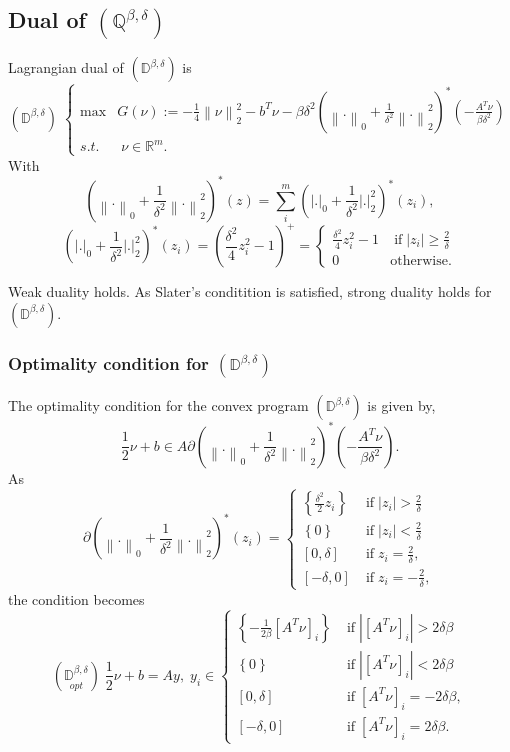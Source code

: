 \documentclass[fleqn]{report} %
\newcommand\ddfrac[2]{\frac{\displaystyle #1}{\displaystyle #2}}
\begin{document}
\subsection{Dual of $(\mathbb{Q}^{\beta,\delta})$}
Lagrangian dual of $(\mathbb{D}^{\beta,\delta})$ is 
\[
		(\mathbb{D}^{\beta,\delta})\;\left\{\begin{array}{ll}
\max & G(\nu):=-\ddfrac{1}{4}\left\|\nu\right\|^2_2 - b^T\nu - \beta\delta^2\left(\left\|.\right\|_0 + \ddfrac{1}{\delta^2}  \left\|.\right\|_2^2\right)^{*}(-\ddfrac{A^T\nu}{\beta\delta^2})\\
		s.t.&\;\nu\in\mathbb{R}^m.
		\end{array} \right.
		\]
With 
		\[
			\left(\left\|.\right\|_0 + \ddfrac{1}{\delta^2}  \left\|.\right\|_2^2\right)^{*}(z) = \sum_{i}^{m}\left(\left|.\right|_0 + \ddfrac{1}{\delta^2} \left|.\right|_2^2\right)^{*}(z_i),
		\]
\[
			\left(\left|.\right|_0 + \ddfrac{1}{\delta^2}  \left|.\right|_2^2\right)^{*}(z_i) = \left(\ddfrac{\delta^2}{4}z_i^2 - 1\right)^+=\left\{ \begin{array}{ll}
\ddfrac{\delta^2}{4}z_i^2 - 1 &\;\text{if}\; \left|z_i\right|\geq \ddfrac{2}{\delta}\\
0& \text{otherwise}.
\end{array}
\right.
		\]

Weak duality holds. As Slater's conditition is satisfied, strong duality holds for $(\mathbb{D}^{\beta,\delta})$.
\subsubsection{Optimality condition for $(\mathbb{D}^{\beta,\delta})$}
The optimality condition for the convex program $(\mathbb{D}^{\beta,\delta})$ is given by,
\[
	\ddfrac{1}{2}\nu+b\in A\partial (\left\|.\right\|_0 + \ddfrac{1}{\delta^2}  \left\|.\right\|_2^2)^{*}(-\ddfrac{A^T\nu}{\beta\delta^2}).
\]
As
\[
\partial (\left\|.\right\|_0 + \ddfrac{1}{\delta^2}  \left\|.\right\|_2^2)^{*}(z_i)=\left\{ \begin{array}{ll}
\left\{\ddfrac{\delta^2}{2}z_i\right\}&\;\text{if}\; \left|z_i\right|> \ddfrac{2}{\delta}  \\
\left\{0\right\} &\;\text{if}\; \left|z_i\right|<  \ddfrac{2}{\delta} \\
\left[0, \delta\right]&\;\text{if}\; z_i=  \ddfrac{2}{\delta} ,\\
\left[-\delta, 0\right]&\;\text{if}\; z_i= - \ddfrac{2}{\delta} ,
\end{array}
\right.
\]
the condition becomes
\[
\left(\underset{opt}{\mathbb{D}^{\beta,\delta}}\right)\;
\ddfrac{1}{2}\nu+b = Ay,\; 
y_i\in 
\left\{ \begin{array}{ll}
\left\{-\ddfrac{1}{2\beta}\left[A^T\nu\right]_i\right\}&\;\text{if}\; \left|\left[A^T\nu\right]_i\right|> 2\delta\beta\\
\left\{0\right\} &\;\text{if}\; \left|\left[A^T\nu\right]_i\right|< 2\delta\beta\\
\left[0, \delta\right]&\;\text{if}\; \left[A^T\nu\right]_i= -2\delta\beta,\\
\left[-\delta, 0\right]&\;\text{if}\; \left[A^T\nu\right]_i= 2\delta\beta.
\end{array}
\right.
\]
\end{document}
